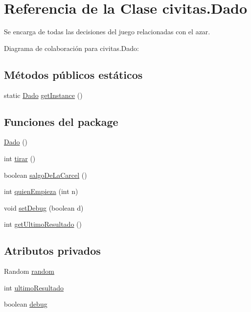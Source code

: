 \hypertarget{classcivitas_1_1Dado}{}\section{Referencia de la Clase civitas.\+Dado}
\label{classcivitas_1_1Dado}


Se encarga de todas las decisiones del juego relacionadas con el azar.  




Diagrama de colaboración para civitas.\+Dado\+:
\subsection*{Métodos públicos estáticos}
\begin{DoxyCompactItemize}
\item 
static \hyperlink{classcivitas_1_1Dado}{Dado} \hyperlink{classcivitas_1_1Dado_a09462f46d46e9555b8cc92ba6a3adc92}{get\+Instance} ()
\end{DoxyCompactItemize}
\subsection*{Funciones del \textquotesingle{}package\textquotesingle{}}
\begin{DoxyCompactItemize}
\item 
\hyperlink{classcivitas_1_1Dado_aab64a2f030d463362b5ec30c8a9a21c8}{Dado} ()
\item 
int \hyperlink{classcivitas_1_1Dado_a178066d320c6cd7c79ac3a5863702fb8}{tirar} ()
\item 
boolean \hyperlink{classcivitas_1_1Dado_ad251122d68a0c513c533c508c9a004d5}{salgo\+De\+La\+Carcel} ()
\item 
int \hyperlink{classcivitas_1_1Dado_afac7574436f47c7a4d5f019b5a43c5bf}{quien\+Empieza} (int n)
\item 
void \hyperlink{classcivitas_1_1Dado_aa12af1adaeed10bfb47e314712bf3b7f}{set\+Debug} (boolean d)
\item 
int \hyperlink{classcivitas_1_1Dado_a7ed26455a30faedfff9878177cf72861}{get\+Ultimo\+Resultado} ()
\end{DoxyCompactItemize}
\subsection*{Atributos privados}
\begin{DoxyCompactItemize}
\item 
Random \hyperlink{classcivitas_1_1Dado_a1f8317d37f9ce44ed673e933b3967811}{random}
\item 
int \hyperlink{classcivitas_1_1Dado_abc53f914b4a8564f59a760e16f0a09ce}{ultimo\+Resultado}
\item 
boolean \hyperlink{classcivitas_1_1Dado_abcc67206a87c44e0960408d447b4cccb}{debug}
\end{DoxyCompactItemize}
